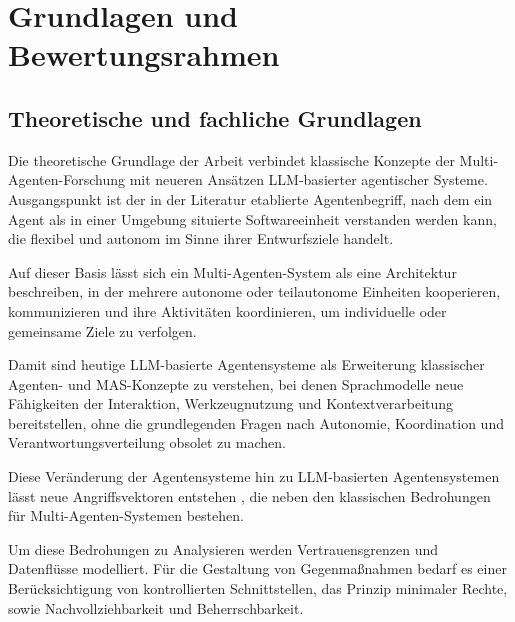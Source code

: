 %

\section{Grundlagen und Bewertungsrahmen}

\subsection{Theoretische und fachliche Grundlagen}

Die theoretische Grundlage der Arbeit verbindet klassische Konzepte der Multi-Agenten-Forschung mit neueren Ansätzen LLM-basierter agentischer Systeme. \cite{wooldridge_intelligent_1995, jennings_roadmap_1998,russell_artificial_2022}
Ausgangspunkt ist der in der Literatur etablierte Agentenbegriff, nach dem ein Agent als in einer Umgebung situierte Softwareeinheit verstanden werden kann, die flexibel und autonom im Sinne ihrer Entwurfsziele handelt. \cite{wooldridge_intelligent_1995, wooldridge_introduction_2002, russell_artificial_2022}

Auf dieser Basis lässt sich ein Multi-Agenten-System als eine Architektur beschreiben, in der mehrere autonome oder teilautonome Einheiten kooperieren, kommunizieren und ihre Aktivitäten koordinieren, um individuelle oder gemeinsame Ziele zu verfolgen. \cite{jennings_roadmap_1998, lesser_retrospective_1991, russell_artificial_2022, botti_agentic_2025}

Damit sind heutige LLM-basierte Agentensysteme als Erweiterung klassischer Agenten- und MAS-Konzepte zu verstehen, bei denen Sprachmodelle neue Fähigkeiten der Interaktion, Werkzeugnutzung und Kontextverarbeitung bereitstellen, ohne die grundlegenden Fragen nach Autonomie, Koordination und Verantwortungsverteilung obsolet zu machen. \cite{botti_agentic_2025,yan_beyond_2025, jennings_roadmap_1998, russell_artificial_2022}

Diese Veränderung der Agentensysteme hin zu LLM-basierten Agentensystemen lässt neue Angriffsvektoren entstehen \cite{tete_threat_2024, krawiecka_extending_2025}, die neben den klassischen Bedrohungen für Multi-Agenten-Systemen bestehen. \cite{wong_adding_2000}

Um diese Bedrohungen zu Analysieren werden Vertrauensgrenzen und Datenflüsse modelliert. Für die Gestaltung von Gegenmaßnahmen bedarf es einer Berücksichtigung von kontrollierten Schnittstellen, das Prinzip minimaler Rechte, sowie Nachvollziehbarkeit und Beherrschbarkeit. \cite{wong_adding_2000, tete_threat_2024}

